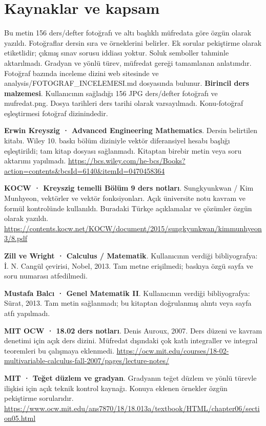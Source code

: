 \clearpage
\section*{Kaynaklar ve kapsam}
Bu metin 156 ders/defter fotoğrafı ve altı başlıklı müfredata göre özgün olarak yazıldı. Fotoğraflar dersin sıra ve örneklerini belirler. Ek sorular pekiştirme olarak etiketlidir; çıkmış sınav sorusu iddiası yoktur. Soluk semboller tahminle aktarılmadı. Gradyan ve yönlü türev, müfredat gereği tamamlanan anlatımdır. Fotoğraf bazında inceleme dizini web sitesinde ve analysis/FOTOGRAF\_INCELEMESI.md dosyasında bulunur.
\textbf{Birincil ders malzemesi}. Kullanıcının sağladığı 156 JPG ders/defter fotoğrafı ve mufredat.png. Dosya tarihleri ders tarihi olarak varsayılmadı. Konu-fotoğraf eşleştirmesi fotoğraf dizinindedir.\par
\textbf{Erwin Kreyszig · Advanced Engineering Mathematics}. Dersin belirtilen kitabı. Wiley 10. baskı bölüm diziniyle vektör diferansiyel hesabı başlığı eşleştirildi; tam kitap dosyası sağlanmadı. Kitaptan birebir metin veya soru aktarımı yapılmadı.
{\footnotesize\url{https://bcs.wiley.com/he-bcs/Books?action=contents&bcsId=6140&itemId=0470458364}}\par
\textbf{KOCW · Kreyszig temelli Bölüm 9 ders notları}. Sungkyunkwan / Kim Munhyeon, vektörler ve vektör fonksiyonları. Açık üniversite notu kavram ve formül kontrolünde kullanıldı. Buradaki Türkçe açıklamalar ve çözümler özgün olarak yazıldı.
{\footnotesize\url{https://contents.kocw.net/KOCW/document/2015/sungkyunkwan/kimmunhyeon3/8.pdf}}\par
\textbf{Zill ve Wright · Calculus / Matematik}. Kullanıcının verdiği bibliyografya: İ. N. Cangül çevirisi, Nobel, 2013. Tam metne erişilmedi; baskıya özgü sayfa ve soru numarası atfedilmedi.\par
\textbf{Mustafa Balcı · Genel Matematik II}. Kullanıcının verdiği bibliyografya: Sürat, 2013. Tam metin sağlanmadı; bu kitaptan doğrulanmış alıntı veya sayfa atfı yapılmadı.\par
\textbf{MIT OCW · 18.02 ders notları}. Denis Auroux, 2007. Ders düzeni ve kavram denetimi için açık ders dizini. Müfredat dışındaki çok katlı integraller ve integral teoremleri bu çalışmaya eklenmedi.
{\footnotesize\url{https://ocw.mit.edu/courses/18-02-multivariable-calculus-fall-2007/pages/lecture-notes/}}\par
\textbf{MIT · Teğet düzlem ve gradyan}. Gradyanın teğet düzlem ve yönlü türevle ilişkisi için açık teknik kontrol kaynağı. Konuya eklenen örnekler özgün pekiştirme sorularıdır.
{\footnotesize\url{https://www.ocw.mit.edu/ans7870/18/18.013a/textbook/HTML/chapter06/section05.html}}\par

